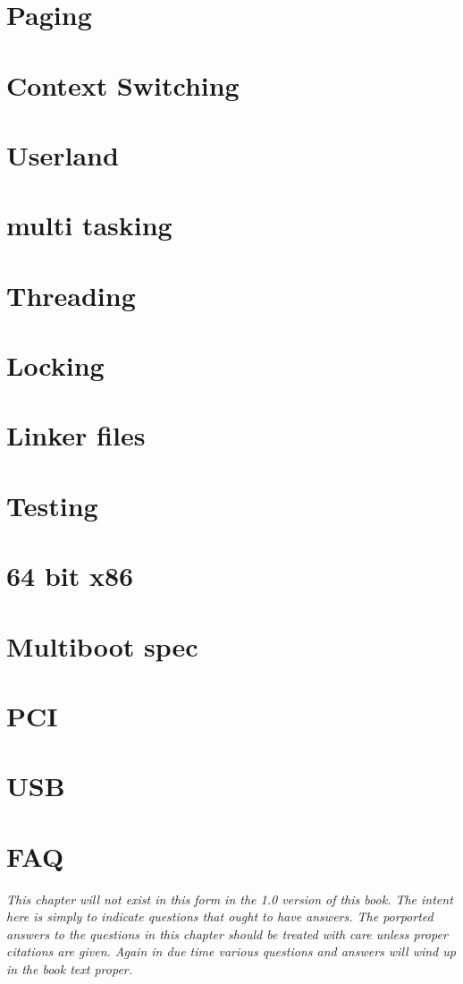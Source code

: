 \documentclass[oneside,english,final]{amsbook}
\begin{document}
\chapter{Paging}
\chapter{Context Switching}
\chapter{Userland}
\chapter{multi tasking}
\chapter{Threading}
\chapter{Locking}
\chapter{Linker files}
\chapter{Testing}
\chapter{64 bit x86}
\chapter{Multiboot spec}
\chapter{PCI}
\chapter{USB}

\chapter{FAQ} {\small\textit{This chapter will not exist in this form in
    the 1.0 version of this book. The intent here is simply to indicate
    questions that ought to have answers. The porported
    answers to the questions in this chapter should be treated with care
    unless proper citations are given. Again in due time various questions
    and answers will wind up in the book text proper.}}
\end{document}
